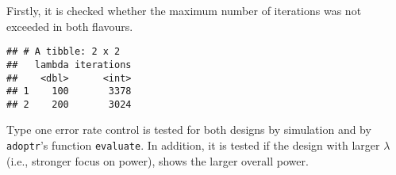 \documentclass[]{book}
\newenvironment{Shaded}{\begin{snugshade}}{\end{snugshade}}
\newcommand{\DataTypeTok}[1]{\textcolor[rgb]{0.13,0.29,0.53}{#1}}
\newcommand{\KeywordTok}[1]{\textcolor[rgb]{0.13,0.29,0.53}{\textbf{#1}}}
\newcommand{\NormalTok}[1]{#1}
\newcommand{\OperatorTok}[1]{\textcolor[rgb]{0.81,0.36,0.00}{\textbf{#1}}}
\newcommand{\StringTok}[1]{\textcolor[rgb]{0.31,0.60,0.02}{#1}}
\begin{document}
Firstly, it is checked whether the maximum number of iterations was not
exceeded in both flavours.

\begin{Shaded}
\end{Shaded}

\begin{verbatim}
## # A tibble: 2 x 2
##   lambda iterations
##    <dbl>      <int>
## 1    100       3378
## 2    200       3024
\end{verbatim}

Type one error rate control is tested for both designs by simulation and by
\texttt{adoptr}'s function \texttt{evaluate}.
In addition, it is tested if the design with larger \(\lambda\) (i.e.,
stronger focus on power), shows the larger overall power.
\end{document}

